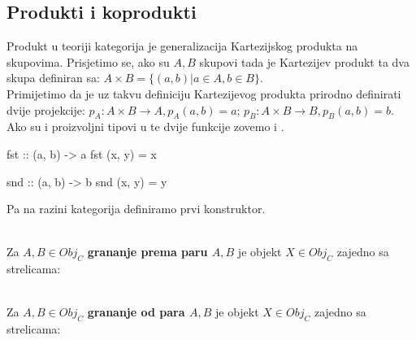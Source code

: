   \subsection{Produkti i koprodukti}
  Produkt u teoriji kategorija je generalizacija Kartezijskog produkta na
  skupovima. Prisjetimo se, ako su $A, B$ skupovi tada je Kartezijev produkt ta
  dva skupa definiran sa: $A \times B = \{ (a, b) | a \in A, b \in B\}$.\\
  
  \noindent Primijetimo da je uz takvu definiciju Kartezijevog produkta prirodno
  definirati dvije projekcije:
    $p_A : A \times B \to A, p_A(a, b) = a$; 
    $p_B : A \times B \to B, p_B(a, b) = b$.\\

  \noindent Ako su  i  proizvoljni tipovi u  te dvije
  funkcije zovemo  i .
  \begin{mcode}
    fst :: (a, b) -> a
    fst (x, y) = x

    snd :: (a, b) -> b
    snd (x, y) = y
  \end{mcode}
  Pa na razini kategorija definiramo prvi konstruktor.\\
  
  \begin{definition}\ \\
  
    \noindent Za $A, B \in Obj_C$ \textbf{grananje prema paru $A, B$} je objekt $X \in
    Obj_C$
    zajedno sa strelicama:
  \begin{center}
  \end{center}
  \end{definition}
  
  \begin{definition}\ \\
  
    \noindent Za $A, B \in Obj_C$ \textbf{grananje od para $A, B$} je objekt $X \in
    Obj_C$
    zajedno sa strelicama:
  \begin{center}
  \end{center}
  \end{definition}
  
